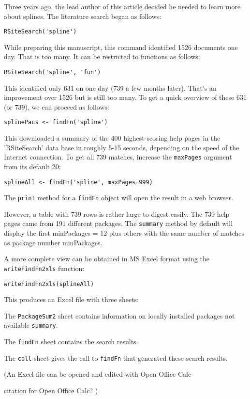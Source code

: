 Three years ago, the lead author of this article decided he
needed to learn more about splines.  The literature search
began as follows:
\begin{verbatim}
RSiteSearch('spline')
\end{verbatim}
While preparing this manuscript, this command identified
1526 documents one day.  That is too many.  It can be
restricted to functions as follows:
\begin{verbatim}
RSiteSearch('spline', 'fun')
\end{verbatim}
This identified only 631 on one day (739 a few months later).
That's an improvement over 1526 but is still too many.
To get a quick overview of these 631 (or 739), we can proceed
as follows:
\begin{verbatim}
splinePacs <- findFn('spline')
\end{verbatim}
This downloaded a summary of the 400 highest-scoring help pages
in the 'RSiteSearch' data base in roughly 5-15 seconds, depending
on the speed of the Internet connection.  To get all 739 matches,
increase the {\tt maxPages} argument from its default 20:
\begin{verbatim}
splineAll <- findFn('spline', maxPages=999)
\end{verbatim}
The {\tt print} method for a {\tt findFn} object
will open the result in a web browser.

However, a table with 739 rows is rather large to digest easily.
The 739 help pages came from 191 different packages.  The
{\tt summary} method by default will display the first
minPackages = 12 plus others with the same number of matches as
package number minPackages.

A more complete view can be obtained in MS Excel format
using the {\tt writeFindFn2xls} function:
\begin{verbatim}
writeFindFn2xls(splineAll)
\end{verbatim}
This produces an Excel file with three sheets:

The {\tt PackageSum2} sheet contains information on locally
installed packages not available {\tt summary}.

The {\tt findFn} sheet contains the search results.

The {\tt call} sheet gives the call to {\tt findFn}
that generated these search results.

(An Excel file can be opened and edited with Open Office
Calc


citation for Open Office Calc?
)

